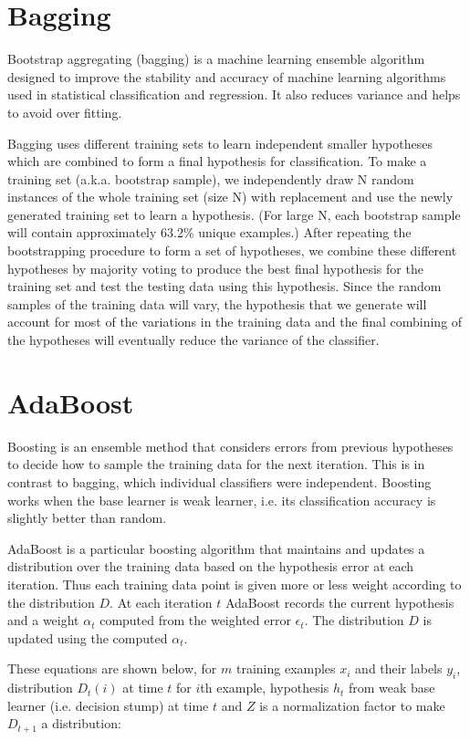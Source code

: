 \documentclass[12pt]{article}
\begin{document}
\section{Bagging}
Bootstrap aggregating (bagging) is a machine learning ensemble algorithm designed to improve the stability and accuracy of machine learning algorithms used in statistical classification and regression. It also reduces variance and helps to avoid over fitting.

Bagging uses different training sets to learn independent smaller hypotheses which are combined to form a final hypothesis for classification. To make a training set (a.k.a. bootstrap sample), we independently draw N random instances of the whole training set (size N) with replacement and use the newly generated training set to learn a hypothesis. (For large N, each bootstrap sample will contain approximately 63.2\% unique examples.) After repeating the bootstrapping procedure to form a set of hypotheses, we combine these different hypotheses by majority voting to produce the best final hypothesis for the training set and test the testing data using this hypothesis. Since the random samples of the training data will vary, the hypothesis that we generate will account for most of the variations in the training data and the final combining of the hypotheses will eventually reduce the variance of the classifier.

\section{AdaBoost}
Boosting is an ensemble method that considers errors from previous hypotheses to decide how to sample the training data for the next iteration. This is in contrast to bagging, which individual classifiers were independent. Boosting works when the base learner is weak learner, i.e. its classification accuracy is slightly better than random.

AdaBoost is a particular boosting algorithm that maintains and updates a distribution over the training data based on the hypothesis error at each iteration. Thus each training data point is given more or less weight according to the distribution \(D\). At each iteration \(t\) AdaBoost records the current hypothesis and a weight \(\alpha_t\) computed from the weighted error \(\epsilon_t\). The distribution \(D\) is updated using the computed \(\alpha_t\).

These equations are shown below, for \(m\) training examples \(x_i\) and their labels \(y_i\), distribution \(D_t(i)\) at time \(t\) for \(i\)th example, hypothesis \(h_t\) from weak base learner (i.e. decision stump) at time \(t\) and \(Z\) is a normalization factor to make \(D_{t+1}\) a distribution:
\end{document}
